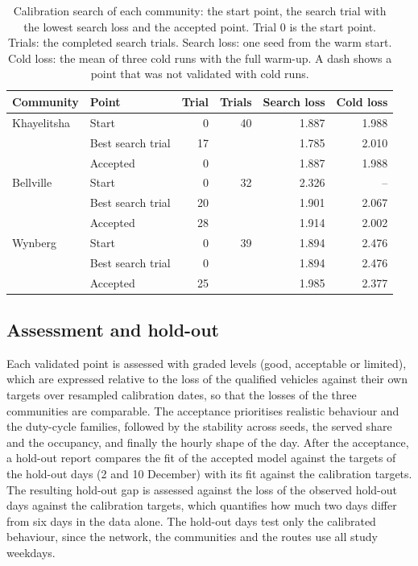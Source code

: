 \begin{table}[htbp]
    \centering
    \footnotesize
    \caption[Calibration search of each community]{Calibration search of each community: the start point, the search trial with the lowest search loss and the accepted point. Trial 0 is the start point. Trials: the completed search trials. Search loss: one seed from the warm start. Cold loss: the mean of three cold runs with the full warm-up. A dash shows a point that was not validated with cold runs.}
    \label{tab:calibration_search}
    \begin{tabularx}{\linewidth}{@{}Xlrrrr@{}}
        \toprule
        \textbf{Community} & Point & Trial & Trials & Search loss & Cold loss \\
        \midrule
        Khayelitsha & Start & 0 & 40 & 1.887 & 1.988 \\
                    & Best search trial & 17 & & 1.785 & 2.010 \\
                    & Accepted & 0 & & 1.887 & 1.988 \\
        \addlinespace
        Bellville   & Start & 0 & 32 & 2.326 & -- \\
                    & Best search trial & 20 & & 1.901 & 2.067 \\
                    & Accepted & 28 & & 1.914 & 2.002 \\
        \addlinespace
        Wynberg     & Start & 0 & 39 & 1.894 & 2.476 \\
                    & Best search trial & 0 & & 1.894 & 2.476 \\
                    & Accepted & 25 & & 1.985 & 2.377 \\
        \bottomrule
    \end{tabularx}
\end{table}

\subsection{Assessment and hold-out}

Each validated point is assessed with graded levels (good, acceptable or limited), which are expressed relative to the loss of the qualified vehicles against their own targets over resampled calibration dates, so that the losses of the three communities are comparable. The acceptance prioritises realistic behaviour and the duty-cycle families, followed by the stability across seeds, the served share and the occupancy, and finally the hourly shape of the day. After the acceptance, a hold-out report compares the fit of the accepted model against the targets of the hold-out days (2 and 10 December) with its fit against the calibration targets. The resulting hold-out gap is assessed against the loss of the observed hold-out days against the calibration targets, which quantifies how much two days differ from six days in the data alone. The hold-out days test only the calibrated behaviour, since the network, the communities and the routes use all study weekdays.

